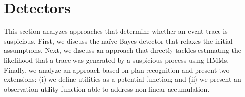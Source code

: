 \section{Detectors}
\label{sec:acc-detectors}



\noindent
This section analyzes approaches that determine whether an event trace is suspicious. First, we discuss the na{\"i}ve Bayes detector that relaxes the initial assumptions. Next, we discuss an approach that directly tackles estimating the likelihood that a trace was generated by a suspicious process using HMMs. Finally, we analyze an approach based on plan recognition and present two extensions: (i) we define utilities as a potential function; and (ii) we present an observation utility function able to address non-linear accumulation.


